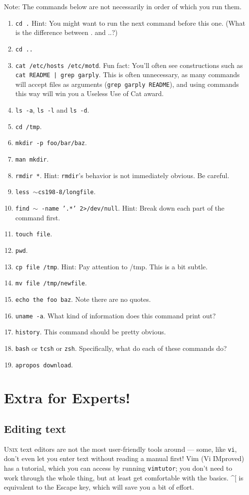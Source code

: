 \documentclass{article}
\begin{document}
Note: The commands below are not necessarily in order of which you run them.
\begin{enumerate}
	\item \texttt{cd .} Hint: You might want to run the next command before this one. (What is the difference between . and ..?)
	\item \texttt{cd ..}
	\item \texttt{cat /etc/hosts /etc/motd}.  Fun fact:  You'll often see constructions such as \texttt{cat README | grep garply}.  This is often unnecessary, as many commands will accept files as arguments (\texttt{grep garply README}), and using commands this way will win you a Useless Use of Cat award.
	\item \texttt{ls -a}, \texttt{ls -l} and \texttt{ls -d}.
	\item \texttt{cd /tmp}.
	\item \texttt{mkdir -p foo/bar/baz}.
	\item \texttt{man mkdir}.
	\item \texttt{rmdir *}.  Hint: \texttt{rmdir}'s behavior is not immediately obvious.  Be careful.
	\item \texttt{less $\sim$cs198-8/longfile}.
	\item \texttt{find $\sim$ -name '.*' 2>/dev/null}. Hint: Break down each part of the command first.
	\item \texttt{touch file}.
	\item \texttt{pwd}.
	\item \texttt{cp file /tmp}. Hint: Pay attention to /tmp. This is a bit subtle.
	\item \texttt{mv file /tmp/newfile}.
	\item \texttt{echo the foo baz}. Note there are no quotes.
	\item \texttt{uname -a}. What kind of information does this command print out?
	\item \texttt{history}. This command should be pretty obvious.
	\item \texttt{bash} or \texttt{tcsh} or \texttt{zsh}. Specifically, what do each of these commands do?
	\item \texttt{apropos download}.
\end{enumerate}

\section{Extra for Experts\texttrademark{}!}
\subsection{Editing text}
\textsc{Unix} text editors are not the most user-friendly tools around --- some, like \texttt{vi}, don't even let you enter text without reading a manual first!  Vim (Vi IMproved) has a tutorial, which you can access by running \texttt{vimtutor}; you don't need to work through the whole thing, but at least get comfortable with the basics.  \textasciicircum{}[ is equivalent to the Escape key, which will save you a bit of effort.
\end{document}
